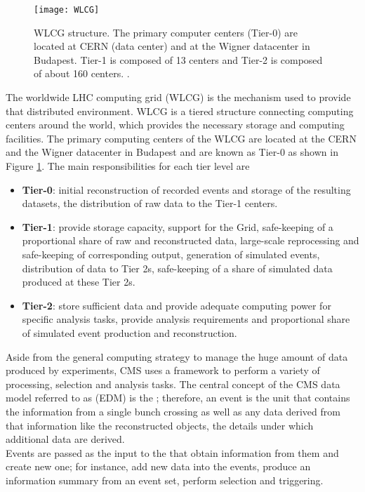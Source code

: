 \begin{figure}[h!]
  \centering
  \texttt{[image: WLCG]}
  \caption[WLCG structure]{WLCG structure. The primary computer centers (Tier-0) are located at CERN (data center) and at the Wigner datacenter in Budapest. Tier-1 is composed of 13 centers and Tier-2 is composed of about 160 centers. \cite{wlcg}. }
  \label{fig:wlcg}
\end{figure}

\noindent The worldwide LHC computing grid (WLCG) is the mechanism used to provide that distributed environment. WLCG is a tiered structure connecting computing centers around the world, which provides the necessary storage and computing facilities. The primary computing centers of the WLCG are located at the CERN and the Wigner datacenter in Budapest and are known as Tier-0 as shown in Figure \ref{fig:wlcg}. The main responsibilities for each tier level are \cite{wlcg}

\begin{itemize}
\item \textbf{Tier-0}: initial reconstruction of recorded events and storage of the resulting datasets, the distribution of raw data to the Tier-1 centers.
\item \textbf{Tier-1}: provide storage capacity, support for the Grid, safe-keeping of a proportional share of raw and reconstructed data, large-scale reprocessing and safe-keeping of corresponding output, generation of simulated events, distribution of data to Tier 2s, safe-keeping of a share of simulated data produced at these Tier 2s.
\item \textbf{Tier-2}: store sufficient data and provide adequate computing power for specific analysis tasks, provide analysis requirements and proportional share of simulated event production and reconstruction.
\end{itemize}

\noindent Aside from the general computing strategy to manage the huge amount of data produced by experiments, CMS uses a framework to perform a variety of processing, selection and analysis tasks. The central concept of the CMS data model referred to as  (EDM) is the ; therefore, an event is the unit that contains the information from a single bunch crossing as well as any data derived from that information like the reconstructed objects, the details under which additional data are derived.\\

\noindent Events are passed as the input to the  that obtain information from them and create new one; for instance,  add new data into the events,  produce an information summary from an event set,  perform selection and triggering.\\

